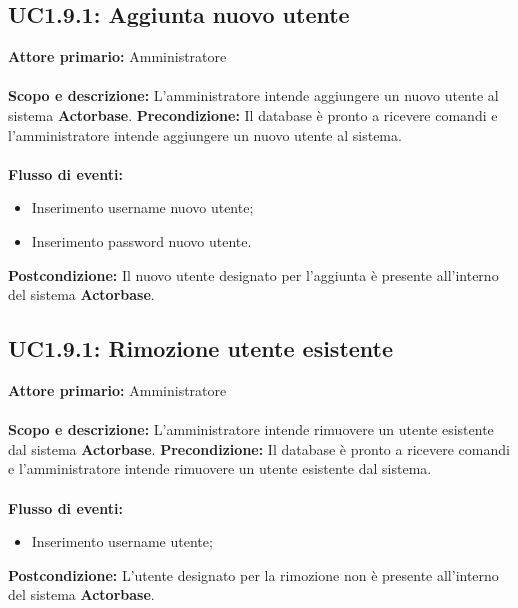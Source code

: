 \documentclass{scalatekids-article}
\begin{document}
\subsection{UC1.9.1: Aggiunta nuovo utente}
\textbf{Attore primario:} Amministratore\\ \\
\textbf{Scopo e descrizione:} L'amministratore intende aggiungere un nuovo utente al sistema \textbf{Actorbase}.
\textbf{Precondizione:} Il database è pronto a ricevere comandi e l'amministratore intende aggiungere un nuovo utente al sistema.\\ \\
\textbf{Flusso di eventi:}
\begin{itemize}
\item Inserimento username nuovo utente;
\item Inserimento password nuovo utente.
\end{itemize}
\textbf{Postcondizione:} Il nuovo utente designato per l'aggiunta è presente all'interno del sistema \textbf{Actorbase}.
\subsection{UC1.9.1: Rimozione utente esistente}
\textbf{Attore primario:} Amministratore\\ \\
\textbf{Scopo e descrizione:} L'amministratore intende rimuovere un utente esistente dal sistema \textbf{Actorbase}.
\textbf{Precondizione:} Il database è pronto a ricevere comandi e l'amministratore intende rimuovere un utente esistente dal sistema.\\ \\
\textbf{Flusso di eventi:}
\begin{itemize}
\item Inserimento username utente;
\end{itemize}
\textbf{Postcondizione:} L'utente designato per la rimozione non è presente all'interno del sistema \textbf{Actorbase}.
\end{document}
